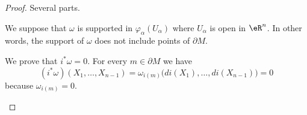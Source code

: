 \begin{proof}
	Several parts.
	\begin{subproof}
				\label{SPITEMooHFTEooAmNIJQ}
		We suppose that \( \omega\) is supported in \( \varphi_{\alpha}(U_{\alpha})\) where \( U_{\alpha}\) is open in \( \eR^n\). In other words, the support of \( \omega\) does not include points of \( \partial M\).
		\begin{subproof}
			\spitem[On \( \partial M\)]
			We prove that \( i^*\omega=0\). For every \( m\in \partial M\) we have
			\begin{equation}
				(i^*\omega)(X_1,\ldots,X_{n-1})=\omega_{i(m)}\big( di(X_1),\ldots,di(X_{n-1}) \big)=0
			\end{equation}
			because \( \omega_{i(m)}=0\).


\end{subproof}
\end{subproof}
\end{proof}
